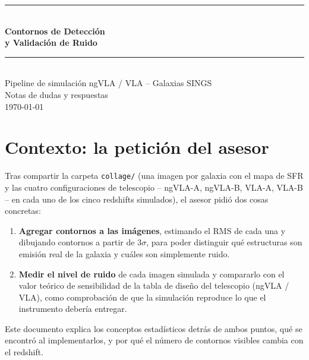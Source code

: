 \documentclass[12pt, a4paper]{article}
\begin{document}
\begin{titlepage}
    \centering
    \vspace*{2cm}
    {\color{azulms}\rule{\linewidth}{1.5pt}}\\[0.4cm]
    {\LARGE\bfseries\color{azulms}
        Contornos de Detección\\[0.3cm]
        y Validación de Ruido}\\[0.4cm]
    {\color{azulms}\rule{\linewidth}{1.5pt}}\\[1.5cm]
    {\normalsize
        Pipeline de simulación ngVLA / VLA -- Galaxias SINGS}\\[2cm]
    {\normalsize Notas de dudas y respuestas}\\[0.5cm]
    {\normalsize \today}
    \vfill
\end{titlepage}

\tableofcontents
\newpage

\section{Contexto: la petición del asesor}

Tras compartir la carpeta \texttt{collage/} (una imagen por galaxia con el mapa
de SFR y las cuatro configuraciones de telescopio -- ngVLA-A, ngVLA-B, VLA-A,
VLA-B -- en cada uno de los cinco redshifts simulados), el asesor pidió dos
cosas concretas:

\begin{enumerate}
    \item \textbf{Agregar contornos a las imágenes}, estimando el RMS de cada
          una y dibujando contornos a partir de $3\sigma$, para poder distinguir
          qué estructuras son emisión real de la galaxia y cuáles son
          simplemente ruido.
    \item \textbf{Medir el nivel de ruido} de cada imagen simulada y compararlo
          con el valor teórico de sensibilidad de la tabla de diseño del
          telescopio (ngVLA / VLA), como comprobación de que la simulación
          reproduce lo que el instrumento debería entregar.
\end{enumerate}

Este documento explica los conceptos estadísticos detrás de ambos puntos,
qué se encontró al implementarlos, y por qué el número de contornos visibles
cambia con el redshift.
\end{document}
